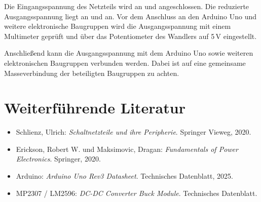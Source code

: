 Die Eingangsspannung des Netzteils wird an  und  angeschlossen. 
Die reduzierte Ausgangsspannung liegt an  und  an. 
Vor dem Anschluss an den Arduino Uno und weitere elektronische Baugruppen wird die Ausgangsspannung mit einem Multimeter geprüft und über das Potentiometer des Wandlers auf 5\,V eingestellt.

Anschließend kann die Ausgangsspannung mit dem Arduino Uno sowie weiteren elektronischen Baugruppen verbunden werden. 
Dabei ist auf eine gemeinsame Masseverbindung der beteiligten Baugruppen zu achten.

\section{Weiterführende Literatur}

\begin{itemize}
	\item Schlienz, Ulrich: \textit{Schaltnetzteile und ihre Peripherie}. Springer Vieweg, 2020. \cite{Schlienz:2020}
	\item Erickson, Robert W. und Maksimovic, Dragan: \textit{Fundamentals of Power Electronics}. Springer, 2020.
	\item Arduino: \textit{Arduino Uno Rev3 Datasheet}. Technisches Datenblatt, 2025. \cite{arduino:uno-datasheet}
	\item MP2307 / LM2596: \textit{DC-DC Converter Buck Module}. Technisches Datenblatt. \cite{MP2307:Datasheet}
\end{itemize}





